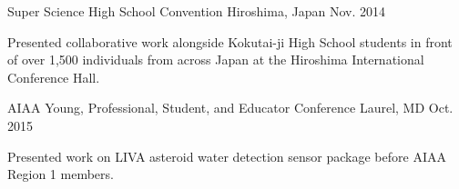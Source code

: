 \begin{cventries}
  \modifiedPresentation
    {}
    {Super Science High School Convention}
    {Hiroshima, Japan}
    {Nov. 2014}
    {
      \begin{cvitems}
        \item {Presented collaborative work alongside Kokutai-ji High School students in front of over 1,500 individuals from across Japan at the Hiroshima International Conference Hall.}
      \end{cvitems}
    }
  \modifiedPresentation
    {}
    {AIAA Young, Professional, Student, and Educator Conference}
    {Laurel, MD}
    {Oct. 2015}
    {
      \begin{cvitems}
        \item {Presented work on LIVA asteroid water detection sensor package before AIAA Region 1 members.}
      \end{cvitems}
    }
\end{cventries}
